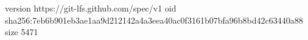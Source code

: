 version https://git-lfs.github.com/spec/v1
oid sha256:7eb6b901eb3ae1aa9d212142a4a3eea40ac0f3161b07bfa96b8bd42c63440a88
size 5471
